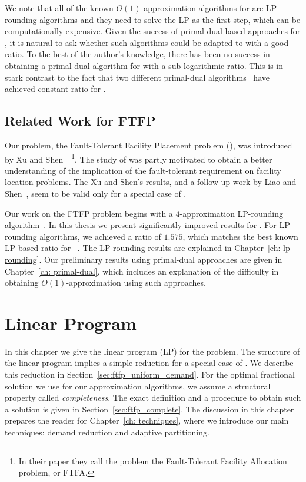 \documentclass[oneside,final]{ucr}
\begin{document}
We note that all of the known $O(1)$-approximation
algorithms for {\FTFL} are LP-rounding algorithms and they
need to solve the LP as the first step, which can be
computationally expensive. Given the success of primal-dual
based approaches for {\UFL}, it is natural to ask whether
such algorithms could be adapted to {\FTFL} with a good
ratio. To the best of the author's knowledge, there has been
no success in obtaining a primal-dual algorithm for {\FTFL}
with a sub-logarithmic ratio. This is in stark contrast to
the fact that two different primal-dual
algorithms~\cite{JainV03,JainMMSV03} have achieved constant
ratio for {\UFL}.

\section{Related Work for FTFP}
Our problem, the Fault-Tolerant Facility Placement problem
(\FTFP), was introduced by Xu and
Shen~\cite{XuS09}~\footnote{In their paper they call the
  problem the Fault-Tolerant Facility Allocation problem, or
  FTFA.}. The study of {\FTFP} was partly motivated to
obtain a better understanding of the implication of the
fault-tolerant requirement on facility location
problems. The Xu and Shen's results, and a follow-up work by
Liao and Shen~\cite{LiaoS11}, seem to be valid only for a
special case of {\FTFP}.

Our work on the FTFP problem begins with a $4$-approximation
LP-rounding algorithm~\cite{YanC11}. In this thesis we
present significantly improved results for {\FTFP}. For
LP-rounding algorithms, we achieved a ratio of $1.575$,
which matches the best known LP-based ratio for
{\UFL}~\cite{ByrkaGS10}. The LP-rounding results are
explained in Chapter~\ref{ch: lp-rounding}. Our preliminary
results using primal-dual approaches are given in
Chapter~\ref{ch: primal-dual}, which includes an explanation
of the difficulty in obtaining $O(1)$-approximation using
such approaches.


\chapter{Linear Program} \label{ch: lp} 

In this chapter we give the linear program (LP) for the
{\FTFP} problem. The structure of the linear program implies
a simple reduction for a special case of {\FTFP}. We
describe this reduction in
Section~\ref{sec:ftfp_uniform_demand}. For the optimal
fractional solution we use for our approximation algorithms,
we assume a structural property called
\emph{completeness}. The exact definition and a procedure to
obtain such a solution is given in
Section~\ref{sec:ftfp_complete}. The discussion in this
chapter prepares the reader for Chapter~\ref{ch:
  techniques}, where we introduce our main techniques:
demand reduction and adaptive partitioning.
\end{document}
